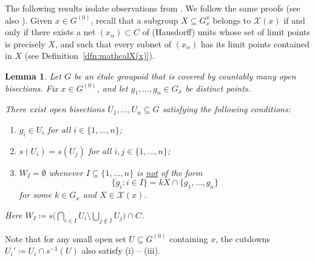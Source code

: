 \documentclass[11pt, oneside, reqno]{amsart}
\newcommand{\Gu}{G^{(0)}}
\newtheorem{lem}[thm]{Lemma}
\theoremstyle{definition}
\theoremstyle{remark}
\numberwithin{equation}{section}
\begin{document}
The following results isolate observations from \cite[Proposition~5.19]{Hume}. We follow the same proofs (see also \cite[Theorem~4.7]{BGHL}). Given $x \in \Gu$, recall that a subgroup $X \subseteq G^x_x$ belongs to $\mathcal{X}(x)$ if and only if there exists a net $(x_\alpha) \subset C$ of (Hausdorff) units whose set of limit points is precisely $X$, and such that every subnet of $(x_{\alpha})$ has its limit points contained in $X$ (see Definition~\ref{dfn:mathcalX(x)}).

\begin{lem}\label{lem:NewWI_condition}
    Let $G$ be an \'etale groupoid that is covered by countably many open bisections.  Fix $x \in \Gu$, and let $g_1, \dots, g_n \in G_{x}$ be distinct points.
    
    There exist open bisections $U_1, \dots, U_n \subseteq G$ satisfying the following conditions:
    \begin{enumerate}[label=(\roman*)]
        \item $g_i \in U_i$ for all $i \in \{1, \dots, n\}$;
        \item $s(U_i) = s(U_j)$ for all $i, j \in \{1, \dots, n\}$;
        \item $W_I = \emptyset$ whenever $I \subseteq \{1, \dotsc, n\}$ is \underline{not} of the form
        \begin{equation}\label{eq:WI_NiceForm}
        \{g_i \colon i \in I\} = kX\cap \{g_1, \dots, g_n\}
        \end{equation}
        for some $k \in G_{x}$ and $X \in \mathcal{X}(x)$.
    \end{enumerate}
    Here $W_I \coloneq s\big( \bigcap_{i \in I} U_i \setminus \bigcup_{j \notin I} U_j \big) \cap C$.    
\end{lem}

Note that for any small open set $U \subseteq \Gu$ containing $x$, the cutdowns $U_i' \coloneq U_i \cap s^{-1}(U)$ also satisfy (i) -- (iii).
\end{document}
